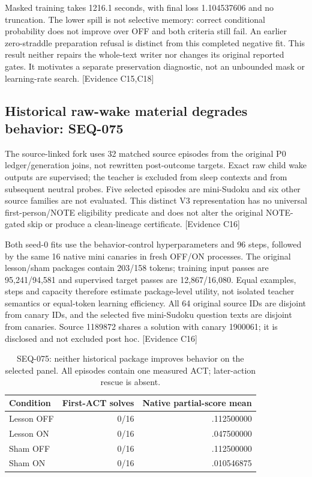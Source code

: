 \documentclass[11pt]{article}
\newcommand{\ev}[1]{\textsf{[Evidence #1]}}
\begin{document}
Masked training takes 1216.1 seconds, with final loss 1.104537606 and no
truncation. The lower spill is not selective memory: correct conditional
probability does not improve over OFF and both criteria still fail. An earlier
zero-straddle preparation refusal is distinct from this completed negative
fit. This result neither repairs the whole-text writer nor changes its original
reported gates. It motivates a separate preservation diagnostic, not an
unbounded mask or learning-rate search. \ev{C15,C18}

\subsection{Historical raw-wake material degrades behavior: SEQ-075}
The source-linked fork uses 32 matched source episodes from the original P0
ledger/generation joins, not rewritten post-outcome targets. Exact raw child
wake outputs are supervised; the teacher is excluded from sleep contexts and
from subsequent neutral probes. Five selected episodes are mini-Sudoku and
six other source families are not evaluated. This distinct V3 representation
has no universal first-person/NOTE eligibility predicate and does not alter
the original NOTE-gated skip or produce a clean-lineage certificate. \ev{C16}

Both seed-0 fits use the behavior-control hyperparameters and 96 steps, followed
by the same 16 native mini canaries in fresh OFF/ON processes. The original
lesson/sham packages contain 203/158 tokens; training input passes are
95,241/94,581 and supervised target passes are 12,867/16,080. Equal examples,
steps and capacity therefore estimate package-level utility, not isolated
teacher semantics or equal-token learning efficiency. All 64 original source
IDs are disjoint from canary IDs, and the selected five mini-Sudoku question
texts are disjoint from canaries. Source 1189872 shares a solution with canary
1900061; it is disclosed and not excluded post hoc. \ev{C16}

\begin{table}[htbp]
\centering\small
\begin{tabular}{lrr}
\toprule
Condition & First-ACT solves & Native partial-score mean \\
\midrule
Lesson OFF & 0/16 & .112500000 \\
Lesson ON & 0/16 & .047500000 \\
Sham OFF & 0/16 & .112500000 \\
Sham ON & 0/16 & .010546875 \\
\bottomrule
\end{tabular}
\caption{SEQ-075: neither historical package improves behavior on the selected
panel. All episodes contain one measured ACT; later-action rescue is absent.}
\label{tab:rawfork}
\end{table}
\end{document}
